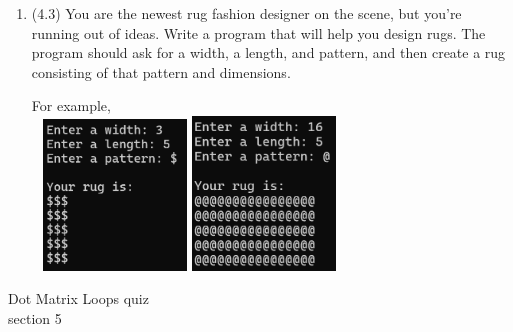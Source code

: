 \documentclass{article}
\begin{document}
\begin{enumerate}

\item (4.3)  
		You are the newest rug fashion designer on the scene, but you're running out of ideas. 
		Write a program that will help you design rugs.  The program should ask for a width, 
		a length, and pattern, and then create a rug consisting of that pattern and dimensions.

		For example, \\ \ \hfill
		\includegraphics[width = 1.5in]{./imgs/rug1.PNG} \hfill  
		\includegraphics[width = 1.5in]{./imgs/rug2.PNG} \hfill \


\end{enumerate}
\pagebreak
Dot Matrix \hfill Loops quiz\\
section 5\\
\end{document}
